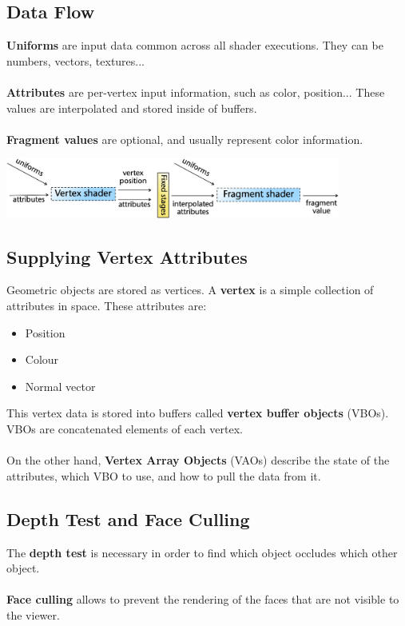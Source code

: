 \documentclass{article}
\begin{document}
\subsection{Data Flow}
\textbf{Uniforms} are input data common across all shader executions. They can be numbers, vectors, textures... \\ \\
\textbf{Attributes} are per-vertex input information, such as color, position... These values are interpolated and stored inside of buffers. \\ \\
\textbf{Fragment values} are optional, and usually represent color information. \\

\begin{center}
	\includegraphics[width=11cm]{data_flow.png}
\end{center}

\subsection{Supplying Vertex Attributes}
Geometric objects are stored as vertices. A \textbf{vertex} is a simple collection of attributes in space. These attributes are:

\begin{itemize}
	\item Position
	\item Colour
	\item Normal vector
\end{itemize}
This vertex data is stored into buffers called \textbf{vertex buffer objects} (VBOs). VBOs are concatenated elements of each vertex. \\ \\
On the other hand, \textbf{Vertex Array Objects} (VAOs) describe the state of the attributes, which VBO to use, and how to pull the data from it.

\subsection{Depth Test and Face Culling}
The \textbf{depth test} is necessary in order to find which object occludes which other object. \\ \\
\textbf{Face culling} allows to prevent the rendering of the faces that are not visible to the viewer.
\end{document}

